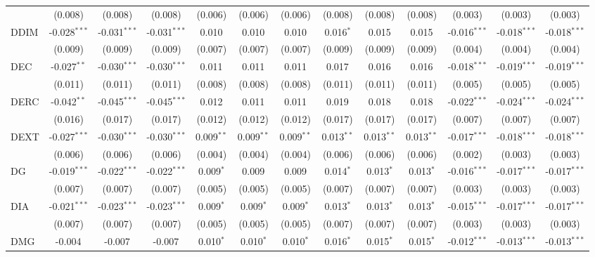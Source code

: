 \begin{table}[!htbp]
\begin{tabular}{@{\extracolsep{5pt}}lcccccccccccc}
  & (0.008) & (0.008) & (0.008) & (0.006) & (0.006) & (0.006) & (0.008) & (0.008) & (0.008) & (0.003) & (0.003) & (0.003) \\
 DDIM & -0.028$^{***}$ & -0.031$^{***}$ & -0.031$^{***}$ & 0.010$^{}$ & 0.010$^{}$ & 0.010$^{}$ & 0.016$^{*}$ & 0.015$^{}$ & 0.015$^{}$ & -0.016$^{***}$ & -0.018$^{***}$ & -0.018$^{***}$ \\
  & (0.009) & (0.009) & (0.009) & (0.007) & (0.007) & (0.007) & (0.009) & (0.009) & (0.009) & (0.004) & (0.004) & (0.004) \\
 DEC & -0.027$^{**}$ & -0.030$^{***}$ & -0.030$^{***}$ & 0.011$^{}$ & 0.011$^{}$ & 0.011$^{}$ & 0.017$^{}$ & 0.016$^{}$ & 0.016$^{}$ & -0.018$^{***}$ & -0.019$^{***}$ & -0.019$^{***}$ \\
  & (0.011) & (0.011) & (0.011) & (0.008) & (0.008) & (0.008) & (0.011) & (0.011) & (0.011) & (0.005) & (0.005) & (0.005) \\
 DERC & -0.042$^{**}$ & -0.045$^{***}$ & -0.045$^{***}$ & 0.012$^{}$ & 0.011$^{}$ & 0.011$^{}$ & 0.019$^{}$ & 0.018$^{}$ & 0.018$^{}$ & -0.022$^{***}$ & -0.024$^{***}$ & -0.024$^{***}$ \\
  & (0.016) & (0.017) & (0.017) & (0.012) & (0.012) & (0.012) & (0.017) & (0.017) & (0.017) & (0.007) & (0.007) & (0.007) \\
 DEXT & -0.027$^{***}$ & -0.030$^{***}$ & -0.030$^{***}$ & 0.009$^{**}$ & 0.009$^{**}$ & 0.009$^{**}$ & 0.013$^{**}$ & 0.013$^{**}$ & 0.013$^{**}$ & -0.017$^{***}$ & -0.018$^{***}$ & -0.018$^{***}$ \\
  & (0.006) & (0.006) & (0.006) & (0.004) & (0.004) & (0.004) & (0.006) & (0.006) & (0.006) & (0.002) & (0.003) & (0.003) \\
 DG & -0.019$^{***}$ & -0.022$^{***}$ & -0.022$^{***}$ & 0.009$^{*}$ & 0.009$^{}$ & 0.009$^{}$ & 0.014$^{*}$ & 0.013$^{*}$ & 0.013$^{*}$ & -0.016$^{***}$ & -0.017$^{***}$ & -0.017$^{***}$ \\
  & (0.007) & (0.007) & (0.007) & (0.005) & (0.005) & (0.005) & (0.007) & (0.007) & (0.007) & (0.003) & (0.003) & (0.003) \\
 DIA & -0.021$^{***}$ & -0.023$^{***}$ & -0.023$^{***}$ & 0.009$^{*}$ & 0.009$^{*}$ & 0.009$^{*}$ & 0.013$^{*}$ & 0.013$^{*}$ & 0.013$^{*}$ & -0.015$^{***}$ & -0.017$^{***}$ & -0.017$^{***}$ \\
  & (0.007) & (0.007) & (0.007) & (0.005) & (0.005) & (0.005) & (0.007) & (0.007) & (0.007) & (0.003) & (0.003) & (0.003) \\
 DMG & -0.004$^{}$ & -0.007$^{}$ & -0.007$^{}$ & 0.010$^{*}$ & 0.010$^{*}$ & 0.010$^{*}$ & 0.016$^{*}$ & 0.015$^{*}$ & 0.015$^{*}$ & -0.012$^{***}$ & -0.013$^{***}$ & -0.013$^{***}$ \\

\end{tabular}
\end{table}
